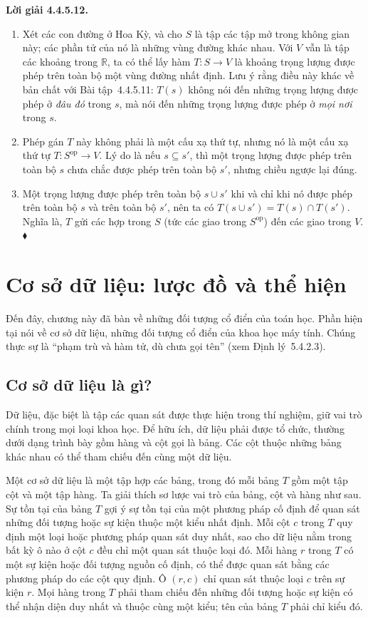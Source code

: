 \noindent\textbf{Lời giải 4.4.5.12.}\keepwithnext
\begin{enumerate}[label=\alph*.]
\item Xét các con đường ở Hoa Kỳ, và cho $S$ là tập các tập mở trong không gian này; các phần tử của nó là những vùng đường khác nhau. Với $V$ vẫn là tập các khoảng trong $\mathbb R$, ta có thể lấy hàm $T:S\to V$ là khoảng trọng lượng được phép trên toàn bộ một vùng đường nhất định. Lưu ý rằng điều này khác về bản chất với Bài tập~4.4.5.11: $T(s)$ không nói đến những trọng lượng được phép ở \emph{đâu đó} trong $s$, mà nói đến những trọng lượng được phép ở \emph{mọi nơi} trong $s$.
\item Phép gán $T$ này không phải là một cấu xạ thứ tự, nhưng nó là một cấu xạ thứ tự $T:S^{\mathrm{op}}\to V$. Lý do là nếu $s\subseteq s'$, thì một trọng lượng được phép trên toàn bộ $s$ chưa chắc được phép trên toàn bộ $s'$, nhưng chiều ngược lại đúng.
\item Một trọng lượng được phép trên toàn bộ $s\cup s'$ khi và chỉ khi nó được phép trên toàn bộ $s$ và trên toàn bộ $s'$, nên ta có $T(s\cup s')=T(s)\cap T(s')$. Nghĩa là, $T$ gửi các hợp trong $S$ (tức các giao trong $S^{\mathrm{op}}$) đến các giao trong $V$.\nobreak\hfill$\blacklozenge$
\end{enumerate}

\section{Cơ sở dữ liệu: lược đồ và thể hiện}

Đến đây, chương này đã bàn về những đối tượng cổ điển của toán học. Phần hiện tại nói về cơ sở dữ liệu, những đối tượng cổ điển của khoa học máy tính. Chúng thực sự là ``phạm trù và hàm tử, dù chưa gọi tên'' (xem Định lý~5.4.2.3).

\subsection{Cơ sở dữ liệu là gì?}

Dữ liệu, đặc biệt là tập các quan sát được thực hiện trong thí nghiệm, giữ vai trò chính trong mọi loại khoa học. Để hữu ích, dữ liệu phải được tổ chức, thường dưới dạng trình bày gồm hàng và cột gọi là bảng. Các cột thuộc những bảng khác nhau có thể tham chiếu đến cùng một dữ liệu.

Một cơ sở dữ liệu là một tập hợp các bảng, trong đó mỗi bảng $T$ gồm một tập cột và một tập hàng. Ta giải thích sơ lược vai trò của bảng, cột và hàng như sau. Sự tồn tại của bảng $T$ gợi ý sự tồn tại của một phương pháp cố định để quan sát những đối tượng hoặc sự kiện thuộc một kiểu nhất định. Mỗi cột $c$ trong $T$ quy định một loại hoặc phương pháp quan sát duy nhất, sao cho dữ liệu nằm trong bất kỳ ô nào ở cột $c$ đều chỉ một quan sát thuộc loại đó. Mỗi hàng $r$ trong $T$ có một sự kiện hoặc đối tượng nguồn cố định, có thể được quan sát bằng các phương pháp do các cột quy định. Ô $(r,c)$ chỉ quan sát thuộc loại $c$ trên sự kiện $r$. Mọi hàng trong $T$ phải tham chiếu đến những đối tượng hoặc sự kiện có thể nhận diện duy nhất và thuộc cùng một kiểu; tên của bảng $T$ phải chỉ kiểu đó.

